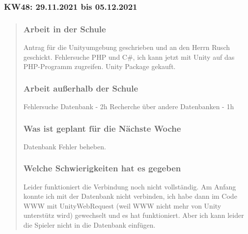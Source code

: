 \subsubsection{KW48: 29.11.2021 bis 05.12.2021}
\begin{quote}
	\subsubsection*{Arbeit in der Schule}
	Antrag für die Unityumgebung geschrieben und an den Herrn Rusch geschickt.
	Fehlersuche PHP und C\#, ich kann jetzt mit Unity auf das PHP-Programm zugreifen.
	Unity Package gekauft.
	
	\subsubsection*{Arbeit außerhalb der Schule}
	Fehlersuche Datenbank - 2h
	Recherche über andere Datenbanken - 1h
	
	\subsubsection*{Was ist geplant für die Nächste Woche}
	Datenbank Fehler beheben.
	
	\subsubsection*{Welche Schwierigkeiten hat es gegeben}
	Leider funktioniert die Verbindung noch nicht vollständig. Am Anfang konnte ich mit der Datenbank nicht verbinden, ich habe dann im Code WWW mit UnityWebRequest (weil WWW nicht mehr von Unity unterstütz wird) gewechselt und es hat funktioniert. Aber ich kann leider die Spieler nicht in die Datenbank einfügen.
	
\end{quote}
